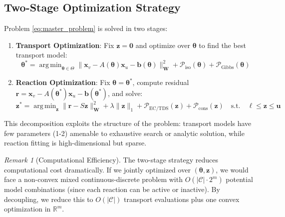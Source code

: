 \documentclass[12pt,a4paper]{article}
\theoremstyle{plain}
\theoremstyle{definition}
\theoremstyle{remark}
\newtheorem{remark}[theorem]{Remark}
\DeclareMathOperator*{\argmin}{arg\,min}
\begin{document}
\subsection{Two-Stage Optimization Strategy}

Problem \eqref{eq:master_problem} is solved in two stages:

\begin{enumerate}
	\item \textbf{Transport Optimization}: Fix $\mathbf{z} = \mathbf{0}$ and optimize over $\boldsymbol{\theta}$ to find the best transport model:
	      \begin{equation}\label{eq:transport_opt}
		      \boldsymbol{\theta}^* = \argmin_{\boldsymbol{\theta} \in \Theta} \|\mathbf{x}_v - A(\boldsymbol{\theta})\mathbf{x}_u - \mathbf{b}(\boldsymbol{\theta})\|_{\mathbf{W}}^2 + \mathcal{P}_{\text{iso}}(\boldsymbol{\theta}) + \mathcal{P}_{\text{Gibbs}}(\boldsymbol{\theta})
	      \end{equation}

	\item \textbf{Reaction Optimization}: Fix $\boldsymbol{\theta} = \boldsymbol{\theta}^*$, compute residual $\mathbf{r} = \mathbf{x}_v - A(\boldsymbol{\theta}^*)\mathbf{x}_u - \mathbf{b}(\boldsymbol{\theta}^*)$, and solve:
	      \begin{equation}\label{eq:reaction_opt}
		      \mathbf{z}^* = \argmin_{\mathbf{z}} \|\mathbf{r} - S\mathbf{z}\|_{\mathbf{W}}^2 + \lambda \|\mathbf{z}\|_1 + \mathcal{P}_{\text{EC/TDS}}(\mathbf{z}) + \mathcal{P}_{\text{cons}}(\mathbf{z}) \quad \text{s.t.} \quad \boldsymbol{\ell} \leq \mathbf{z} \leq \mathbf{u}
	      \end{equation}
\end{enumerate}

This decomposition exploits the structure of the problem: transport models have few parameters (1-2) amenable to exhaustive search or analytic solution, while reaction fitting is high-dimensional but sparse.

\begin{remark}[Computational Efficiency]
	The two-stage strategy reduces computational cost dramatically. If we jointly optimized over $(\boldsymbol{\theta}, \mathbf{z})$, we would face a non-convex mixed continuous-discrete problem with $O(|\mathcal{C}| \cdot 2^m)$ potential model combinations (since each reaction can be active or inactive). By decoupling, we reduce this to $O(|\mathcal{C}|)$ transport evaluations plus one convex optimization in $\mathbb{R}^m$.
\end{remark}
\newpage
\end{document}
